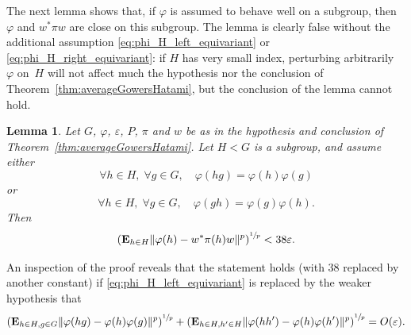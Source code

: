 \documentclass[10pt]{amsart}
\theoremstyle{plain}
\newtheorem{lemma}[theorem]{Lemma}
\theoremstyle{definition}
\newcommand{\E}{\mathbf{E}}
\begin{document}
The next lemma shows that, if $\varphi$ is assumed to behave well on a subgroup, then~$\varphi$ and $w^* \pi w$ are close on this subgroup. The lemma is clearly false without the additional assumption \eqref{eq:phi_H_left_equivariant} or \eqref{eq:phi_H_right_equivariant}: if $H$ has very small index, perturbing arbitrarily~$\varphi$ on~$H$ will not affect much the hypothesis nor the conclusion of Theorem~\ref{thm:averageGowersHatami}, but the conclusion of the lemma cannot hold.
\begin{lemma}\label{lem:GowersHatami_subgroup} Let $G$, $\varphi$, $\varepsilon$, $P$, $\pi$ and $w$ be as in the hypothesis and conclusion of Theorem~\ref{thm:averageGowersHatami}. Let $H<G$ is a subgroup, and assume either\vspace*{-3pt}
\begin{equation}\label{eq:phi_H_left_equivariant}
\forall h\in H,\; \forall g\in G,\quad \varphi(hg) = \varphi(h) \varphi(g)
\end{equation}
or\vspace*{-3pt}
\begin{equation}\label{eq:phi_H_right_equivariant}
\forall h\in H,\; \forall g\in G,\quad \varphi(gh) = \varphi(g) \varphi(h).
\end{equation}
Then\vspace*{-3pt}
\[
\left(\E_{h \in H} \|\varphi(h)-w^* \pi(h) w\|^p\right)^{\sfrac 1 p}< 38 \varepsilon.
\]
\end{lemma}
An inspection of the proof reveals that the statement holds (with $38$ replaced by another constant) if \eqref{eq:phi_H_left_equivariant} is replaced by the weaker hypothesis that\vspace*{-3pt}
\[
\left(\E_{h\in H,g \in G} \|\varphi(hg) - \varphi(h) \varphi(g)\|^p\right)^{\sfrac 1 p} + \left(\E_{h \in H, h'\in H} \|\varphi(hh') - \varphi(h) \varphi(h')\|^p\right)^{\sfrac 1 p} = O(\varepsilon).
\]
\end{document}
